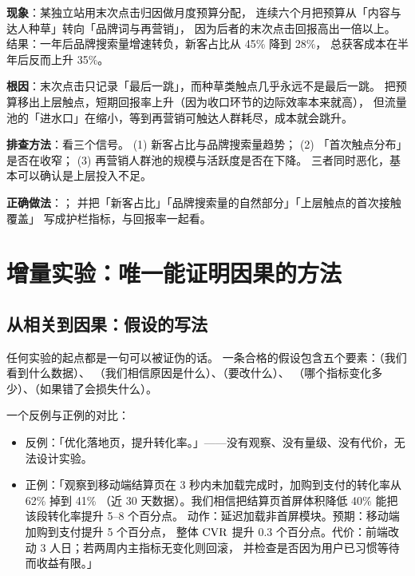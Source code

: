 \begin{pitfall}
\textbf{现象}：某独立站用末次点击归因做月度预算分配，
连续六个月把预算从「内容与达人种草」转向「品牌词与再营销」，
因为后者的末次点击回报高出一倍以上。
结果：一年后品牌搜索量增速转负，新客占比从 45\% 降到 28\%，
总获客成本在半年后反而上升 35\%。

\textbf{根因}：末次点击只记录「最后一跳」，而种草类触点几乎永远不是最后一跳。
把预算移出上层触点，短期回报率上升（因为收口环节的边际效率本来就高），
但流量池的「进水口」在缩小，等到再营销可触达人群耗尽，成本就会跳升。

\textbf{排查方法}：看三个信号。
(1) 新客占比与品牌搜索量趋势；
(2) 「首次触点分布」是否在收窄；
(3) 再营销人群池的规模与活跃度是否在下降。
三者同时恶化，基本可以确认是上层投入不足。

\textbf{正确做法}：；
并把「新客占比」「品牌搜索量的自然部分」「上层触点的首次接触覆盖」
写成护栏指标，与回报率一起看。
\end{pitfall}

\section{增量实验：唯一能证明因果的方法}

\subsection{从相关到因果：假设的写法}

任何实验的起点都是一句可以被证伪的话。
一条合格的假设包含五个要素：（我们看到什么数据）、
（我们相信原因是什么）、（要改什么）、
（哪个指标变化多少）、（如果错了会损失什么）。

一个反例与正例的对比：
\begin{itemize}
  \item 反例：「优化落地页，提升转化率。」——没有观察、没有量级、没有代价，无法设计实验。
  \item 正例：「观察到移动端结算页在 3 秒内未加载完成时，加购到支付的转化率从 62\% 掉到 41\%
        （近 30 天数据）。我们相信把结算页首屏体积降低 40\% 能把该段转化率提升 5--8 个百分点。
        动作：延迟加载非首屏模块。预期：移动端加购到支付提升 5 个百分点，
        整体 $\operatorname{CVR}$ 提升 0.3 个百分点。代价：前端改动 3 人日；若两周内主指标无变化则回滚，
        并检查是否因为用户已习惯等待而收益有限。」
\end{itemize}

